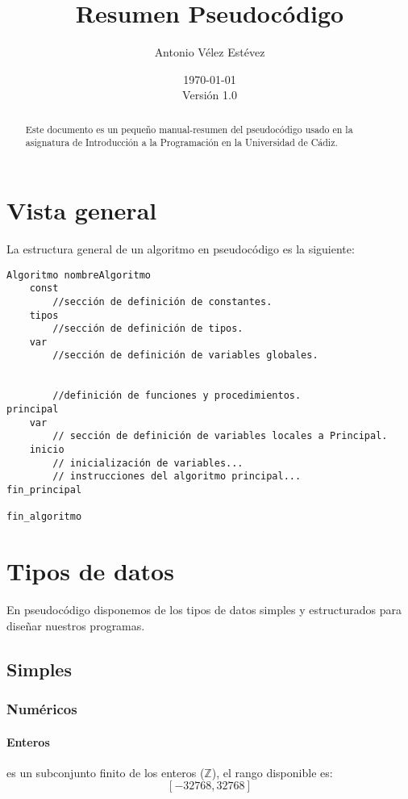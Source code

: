\documentclass{article}
\title{Resumen Pseudocódigo}
\author{Antonio Vélez Estévez}
\date{\today\\\vspace{2em}Versión 1.0}
\begin{document}
\maketitle
\begin{abstract}
  
  Este documento es un pequeño manual-resumen del pseudocódigo usado en la asignatura de Introducción a la Programación en la Universidad de Cádiz.
  
\end{abstract}

\tableofcontents

\pagebreak

\section{Vista general}

La estructura general de un algoritmo en pseudocódigo es la siguiente:

\begin{lstlisting}[language=pseudocodigoesp]
Algoritmo nombreAlgoritmo
    const
        //sección de definición de constantes.
    tipos
        //sección de definición de tipos.
    var
        //sección de definición de variables globales.


        //definición de funciones y procedimientos.
principal
    var
        // sección de definición de variables locales a Principal.
    inicio
        // inicialización de variables...
        // instrucciones del algoritmo principal...
fin_principal

fin_algoritmo
\end{lstlisting}

\section{Tipos de datos}

En pseudocódigo disponemos de los tipos de datos simples y estructurados para diseñar nuestros programas.

\subsection{Simples}

\subsubsection{Numéricos}

\paragraph{Enteros}
es un subconjunto finito de los enteros ($\mathbb{Z}$), el rango disponible es: $$\left[-32768, 32768\right]$$
\end{document}

